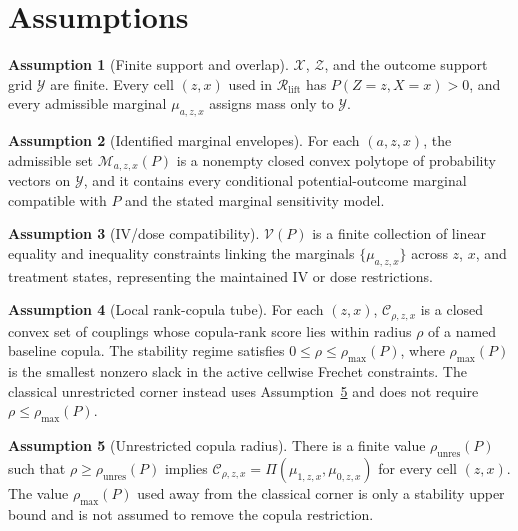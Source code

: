 \documentclass[11pt]{article}
\theoremstyle{definition}
\newtheorem{assumption}{Assumption}
\theoremstyle{plain}
\theoremstyle{remark}
\begin{document}
\section{Assumptions}
\begin{assumption}[Finite support and overlap]\label{ass:finite-overlap}
\(\mathcal X\), \(\mathcal Z\), and the outcome support grid \(\mathcal Y\) are finite.  Every cell \((z,x)\) used in \(\mathcal R_{\mathrm{lift}}\) has \(P(Z=z,X=x)>0\), and every admissible marginal \(\mu_{a,z,x}\) assigns mass only to \(\mathcal Y\).
\end{assumption}

\begin{assumption}[Identified marginal envelopes]\label{ass:marginal-envelope}
For each \((a,z,x)\), the admissible set \(\mathcal M_{a,z,x}(P)\) is a nonempty closed convex polytope of probability vectors on \(\mathcal Y\), and it contains every conditional potential-outcome marginal compatible with \(P\) and the stated marginal sensitivity model.
\end{assumption}

\begin{assumption}[IV/dose compatibility]\label{ass:iv-dose}
\(\mathcal V(P)\) is a finite collection of linear equality and inequality constraints linking the marginals \(\{\mu_{a,z,x}\}\) across \(z\), \(x\), and treatment states, representing the maintained IV or dose restrictions.
\end{assumption}

\begin{assumption}[Local rank-copula tube]\label{ass:rank-tube}
For each \((z,x)\), \(\mathcal C_{\rho,z,x}\) is a closed convex set of couplings whose copula-rank score lies within radius \(\rho\) of a named baseline copula.  The stability regime satisfies \(0\le\rho\le\rho_{\max}(P)\), where \(\rho_{\max}(P)\) is the smallest nonzero slack in the active cellwise Frechet constraints.  The classical unrestricted corner instead uses Assumption~\ref{ass:unrestricted-rho} and does not require \(\rho\le\rho_{\max}(P)\).
\end{assumption}

\begin{assumption}[Unrestricted copula radius]\label{ass:unrestricted-rho}
There is a finite value \(\rho_{\mathrm{unres}}(P)\) such that \(\rho\ge\rho_{\mathrm{unres}}(P)\) implies \(\mathcal C_{\rho,z,x}=\Pi(\mu_{1,z,x},\mu_{0,z,x})\) for every cell \((z,x)\).  The value \(\rho_{\max}(P)\) used away from the classical corner is only a stability upper bound and is not assumed to remove the copula restriction.
\end{assumption}
\end{document}
